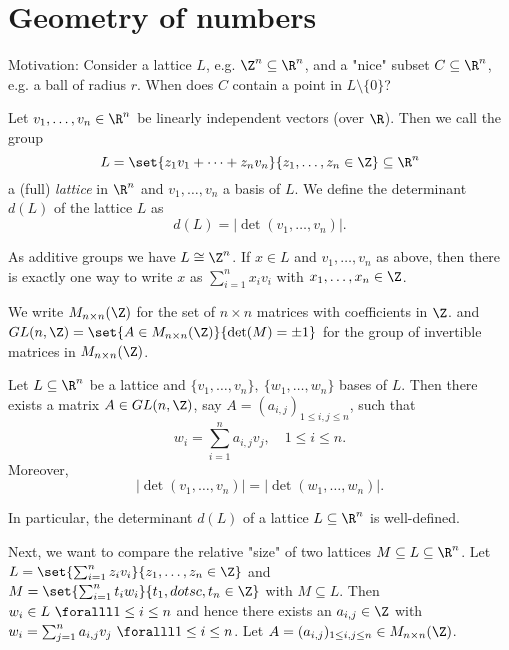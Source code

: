 \section{Geometry of numbers}

Motivation: Consider a lattice \( L \), e.g. \( \Z^n \subseteq \R^n \), and a "nice" subset \( C \subseteq \R^n \), e.g. a ball of radius \( r \).
When does \( C \) contain a point in \( L \setminus\{0\} \)?

\begin{defn*}[Lattice]
	Let \( v_1, \dotsc, v_n \in \R^n \) be linearly independent vectors (over \( \R \)).
	Then we call the group
	\[ L = \set{z_1 v_1 + \dots + z_n v_n}{z_1, \dotsc, z_n \in \Z} \subseteq \R^n \]
	a (full) \emph{lattice} in \( \R^n \) and \( v_1, \dotsc, v_n \) a basis of \( L \).
	We define the determinant \( d(L) \) of the lattice \( L \) as
	\[ d(L) = |\det(v_1, \dotsc, v_n)|. \]
\end{defn*}

\begin{rem*}
	As additive groups we have \( L \cong \Z^n \).
	If \( x \in L \) and \( v_1, \dotsc, v_n \) as above, then there is exactly one way to write \( x \) as \( \sum_{i=1}^{n} x_i v_i \) with \( x_1, \dotsc, x_n \in \Z \).
\end{rem*}

\begin{notat*}
	We write \( M_{n \times n}(\Z) \) for the set of \( n \times n \) matrices with coefficients in \( \Z \). and \( GL(n, \Z) = \set{A \in M_{n \times n}(\Z)}{\det(M) = \pm 1} \) for the group of invertible matrices in \( M_{n \times n}(\Z) \).
\end{notat*}

\begin{lem}
	Let \( L \subseteq \R^n \) be a lattice and \( \{v_1, \dotsc, v_n\},\ \{w_1, \dotsc, w_n\} \) bases of \( L \).
	Then there exists a matrix \( A \in GL(n, \Z) \), say \( A = (a_{i,j})_{1 \leq i,j \leq n} \), such that
	\[ w_i = \sum_{i=1}^{n} a_{i,j}v_j,\quad 1 \leq i \leq n. \]
	Moreover,
	\[ |\det (v_1, \dotsc, v_n)| = |\det(w_1, \dotsc, w_n)|. \]
\end{lem}

\begin{rem*}
	In particular, the determinant \( d(L) \) of a lattice \( L \subseteq \R^n \) is well-defined.
\end{rem*}

Next, we want to compare the relative "size" of two lattices \( M \subseteq L \subseteq \R^n \).
Let \( L = \set{\sum_{i=1}^{n} z_i v_i}{z_1, \dotsc, z_n \in \Z} \) and \( M = \set{\sum_{i=1}^{n} t_i w_i}{t_1, dotsc, t_n \in \Z} \) with \( M \subseteq L \).
Then \( w_i \in L\ \foralll 1 \leq i \leq n \) and hence there exists an \( a_{i,j} \in \Z \) with \( w_i = \sum_{j=1}^{n} a_{i,j} v_j\ \foralll 1 \leq i \leq n \).
Let \( A = (a_{i,j})_{1 \leq i,j \leq n} \in M_{n \times n}(\Z) \).

